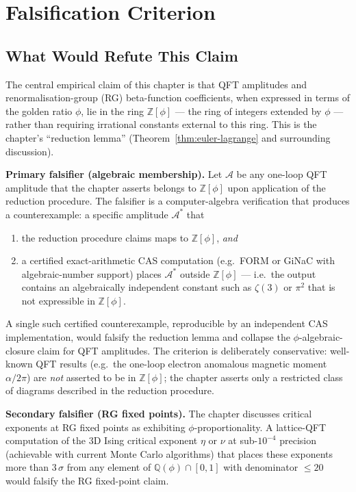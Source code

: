 \section{Falsification Criterion}\label{sec:21-falsify}

\subsection{What Would Refute This Claim}

The central empirical claim of this chapter is that QFT amplitudes and
renormalisation-group (RG) beta-function coefficients, when expressed
in terms of the golden ratio $\phi$, lie in the ring
$\mathbb{Z}[\phi]$ — the ring of integers extended by $\phi$ — rather
than requiring irrational constants external to this ring.  This is
the chapter's ``reduction lemma'' (Theorem~\ref{thm:euler-lagrange}
and surrounding discussion).

\medskip
\noindent\textbf{Primary falsifier (algebraic membership).}
Let $\mathcal{A}$ be any one-loop QFT amplitude that the chapter
asserts belongs to $\mathbb{Z}[\phi]$ upon application of the
reduction procedure.  The falsifier is a computer-algebra
verification that produces a counterexample: a specific amplitude
$\mathcal{A}^*$ that
\begin{enumerate}
  \item the reduction procedure claims maps to $\mathbb{Z}[\phi]$,
        \emph{and}
  \item a certified exact-arithmetic CAS computation (e.g.\ FORM or
        GiNaC with algebraic-number support) places
        $\mathcal{A}^*$ outside $\mathbb{Z}[\phi]$ — i.e.\ the output
        contains an algebraically independent constant such as
        $\zeta(3)$ or $\pi^2$ that is not expressible in $\mathbb{Z}[\phi]$.
\end{enumerate}
A single such certified counterexample, reproducible by an independent
CAS implementation, would falsify the reduction lemma and collapse the
$\phi$-algebraic-closure claim for QFT amplitudes.  The criterion is
deliberately conservative: well-known QFT results (e.g.\ the
one-loop electron anomalous magnetic moment $\alpha/2\pi$) are
\emph{not} asserted to be in $\mathbb{Z}[\phi]$; the chapter asserts
only a restricted class of diagrams described in the reduction
procedure.

\medskip
\noindent\textbf{Secondary falsifier (RG fixed points).}
The chapter discusses critical exponents at RG fixed points as
exhibiting $\phi$-proportionality.  A lattice-QFT computation of the
3D Ising critical exponent $\eta$ or $\nu$ at sub-$10^{-4}$ precision
(achievable with current Monte Carlo algorithms) that places these
exponents more than $3\,\sigma$ from any element of
$\mathbb{Q}(\phi) \cap [0,1]$ with denominator $\leq 20$ would
falsify the RG fixed-point claim.

